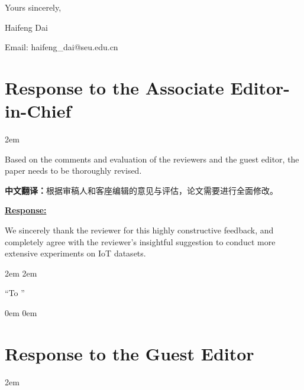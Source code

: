 \documentclass[a4paper,12pt]{article}
\newcommand{\zhtranslationfirst}[1]{%
    \par\medskip\noindent
    {\small\color{blue!60!black}\textbf{中文翻译：}#1}\par
}
\begin{document}
\bigskip

\bigskip

\noindent
Yours sincerely,

\smallskip

\noindent
Haifeng Dai
\smallskip

\noindent
Email: haifeng\_dai@seu.edu.cn

\newpage
\section*{Response to the Associate Editor-in-Chief}
\parindent 2em

\begin{tcolorbox}[title = {Comment},fonttitle = \bfseries]
    Based on the comments and evaluation of the reviewers and the guest editor, the paper needs to be thoroughly revised.
    \zhtranslationfirst{根据审稿人和客座编辑的意见与评估，论文需要进行全面修改。}
\end{tcolorbox}

\noindent \underline {\textbf{Response:}}
\bigskip

We sincerely thank the reviewer for this highly constructive feedback, and completely agree with the reviewer's insightful suggestion to conduct more extensive experiments on IoT datasets.

\leftskip 2em
\rightskip 2em
\medskip

``To ''

\leftskip 0em
\rightskip 0em
\medskip

\newpage
\section*{Response to the Guest Editor}
\parindent 2em
\end{document}
